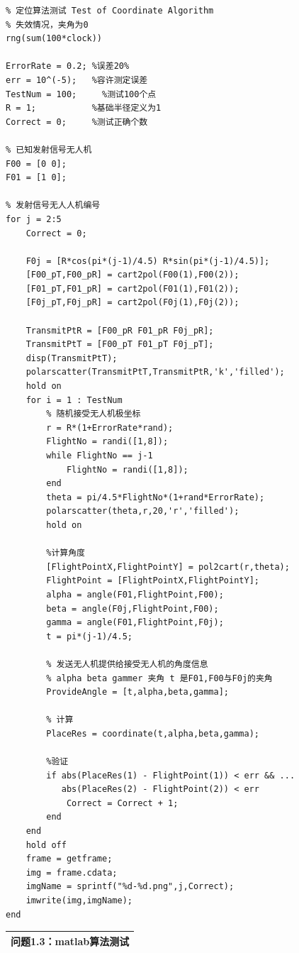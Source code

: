 \documentclass{my_paper}
\begin{document}
\begin{lstlisting}
% 定位算法测试 Test of Coordinate Algorithm
% 失效情况，夹角为0
rng(sum(100*clock))

ErrorRate = 0.2; %误差20%
err = 10^(-5);   %容许测定误差
TestNum = 100;     %测试100个点
R = 1;           %基础半径定义为1
Correct = 0;     %测试正确个数

% 已知发射信号无人机
F00 = [0 0];
F01 = [1 0];

% 发射信号无人人机编号
for j = 2:5
    Correct = 0;

    F0j = [R*cos(pi*(j-1)/4.5) R*sin(pi*(j-1)/4.5)];
    [F00_pT,F00_pR] = cart2pol(F00(1),F00(2));
    [F01_pT,F01_pR] = cart2pol(F01(1),F01(2));
    [F0j_pT,F0j_pR] = cart2pol(F0j(1),F0j(2));

    TransmitPtR = [F00_pR F01_pR F0j_pR];
    TransmitPtT = [F00_pT F01_pT F0j_pT];
    disp(TransmitPtT);
    polarscatter(TransmitPtT,TransmitPtR,'k','filled');
    hold on
    for i = 1 : TestNum
        % 随机接受无人机极坐标
        r = R*(1+ErrorRate*rand);
        FlightNo = randi([1,8]);
        while FlightNo == j-1
            FlightNo = randi([1,8]);
        end
        theta = pi/4.5*FlightNo*(1+rand*ErrorRate);
        polarscatter(theta,r,20,'r','filled');
        hold on

        %计算角度
        [FlightPointX,FlightPointY] = pol2cart(r,theta);
        FlightPoint = [FlightPointX,FlightPointY];
        alpha = angle(F01,FlightPoint,F00);
        beta = angle(F0j,FlightPoint,F00);
        gamma = angle(F01,FlightPoint,F0j);
        t = pi*(j-1)/4.5;

        % 发送无人机提供给接受无人机的角度信息
        % alpha beta gammer 夹角 t 是F01,F00与F0j的夹角
        ProvideAngle = [t,alpha,beta,gamma];

        % 计算
        PlaceRes = coordinate(t,alpha,beta,gamma);
        
        %验证
        if abs(PlaceRes(1) - FlightPoint(1)) < err && ...
           abs(PlaceRes(2) - FlightPoint(2)) < err
            Correct = Correct + 1;
        end
    end
    hold off
    frame = getframe;
    img = frame.cdata;
    imgName = sprintf("%d-%d.png",j,Correct);
    imwrite(img,imgName);
end

\end{lstlisting}

\begin{table}[htbp]
    \centering
    \begin{tabular}{|p{14.0cm}|}
    \hline
    \textbf{问题1.3：matlab算法测试} \\ %
    \hline
    \end{tabular}
\end{table}
\end{document}
